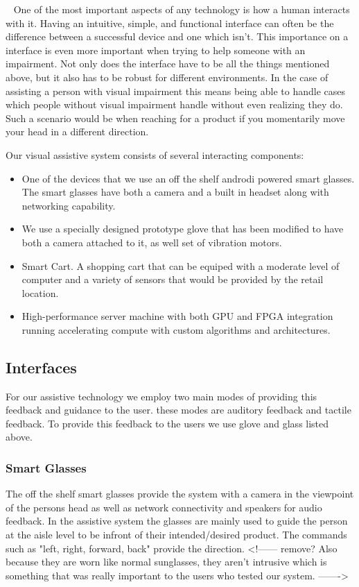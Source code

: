 ~\cite{something}
One of the most important aspects of any technology is how a human interacts with it.
Having an intuitive, simple, and functional interface can often be the difference between
a successful device and one which isn't. This importance on a interface is even more important
when trying to help someone with an impairment. Not only does the interface have to be all
the things mentioned above, but it also has to be robust for different environments. In the
case of assisting a person with visual impairment this means being able to handle cases
which people without visual impairment handle without even realizing they do. Such a scenario
would be when reaching for a product if you momentarily move your head in a different direction.

Our visual assistive system consists of several interacting components: 

\begin{itemize}
\item One of the devices that we use an off the shelf androdi powered smart glasses. 
The smart glasses have both a camera and a built in headset along with
networking capability. 
\item We use a specially designed prototype glove that has been
modified to have both a camera attached to it, as well set of
vibration motors. 
\item Smart Cart. A shopping cart that can be equiped with a moderate level of computer
and a variety of sensors that would be provided by the retail location.
\item High-performance server machine with both GPU and FPGA integration running
accelerating compute with custom algorithms and architectures.
\end{itemize}
\subsection{Interfaces}
For our assistive technology we employ two main modes of providing this feedback and guidance to the user. these modes are auditory feedback and tactile feedback. To provide this feedback to the users we use glove and glass listed above.
\subsubsection{Smart Glasses}
The off the shelf smart glasses provide the system with a camera in the viewpoint
of the persons head as well as network connectivity and speakers for audio feedback.
In the assistive system the glasses are mainly used to guide the person at the aisle level
to be infront of their intended/desired product. The commands such as "left, right, forward, back"
provide the direction. 
<!------ remove?
Also because they are worn like normal
sunglasses, they aren't intrusive which is something that was really
important to the users who tested our system.
------->
